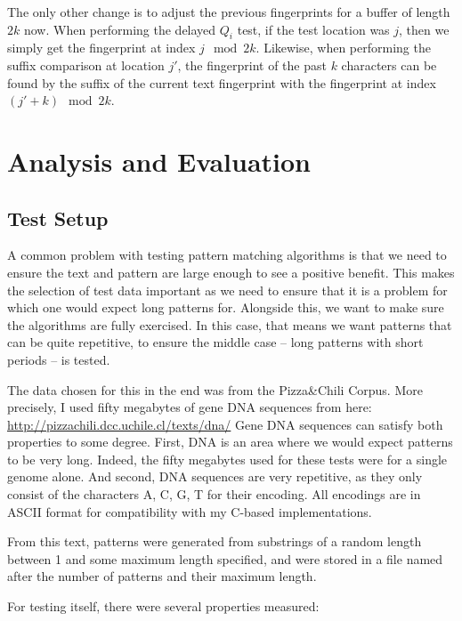 \documentclass[ %
                    author={Dominic Joseph Moylett},
                    degree={MEng},
                     title={Dictionary Matching with Fingerprints},
                  subtitle={An Empirical Analysis},
                      type={research},
                      year={2015} ]{dissertation}
\begin{document}
The only other change is to adjust the previous fingerprints for a buffer of length $2k$ now. When performing the delayed $Q_i$ test, if the test location was $j$, then we simply get the fingerprint at index $j \mod 2k$. Likewise, when performing the suffix comparison at location $j'$, the fingerprint of the past $k$ characters can be found by the suffix of the current text fingerprint with the fingerprint at index $(j' + k) \mod 2k$.


\chapter{Analysis and Evaluation}
\label{chap:evaluation}

\section{Test Setup}
\label{sec:test-setup}

A common problem with testing pattern matching algorithms is that we need to ensure the text and pattern are large enough to see a positive benefit. This makes the selection of test data important as we need to ensure that it is a problem for which one would expect long patterns for. Alongside this, we want to make sure the algorithms are fully exercised. In this case, that means we want patterns that can be quite repetitive, to ensure the middle case -- long patterns with short periods -- is tested.

The data chosen for this in the end was from the Pizza\&Chili Corpus. More precisely, I used fifty megabytes of gene DNA sequences from here: \url{http://pizzachili.dcc.uchile.cl/texts/dna/} Gene DNA sequences can satisfy both properties to some degree. First, DNA is an area where we would expect patterns to be very long. Indeed, the fifty megabytes used for these tests were for a single genome alone. And second, DNA sequences are very repetitive, as they only consist of the characters A, C, G, T for their encoding. All encodings are in ASCII format for compatibility with my C-based implementations.

From this text, patterns were generated from substrings of a random length between 1 and some maximum length specified, and were stored in a file named after the number of patterns and their maximum length.

For testing itself, there were several properties measured:
\end{document}

